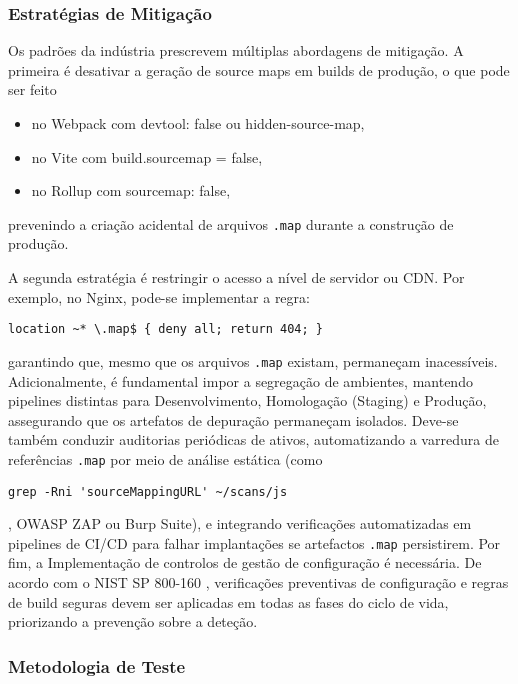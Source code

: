 \subsubsection{Estratégias de Mitigação}
\label{subsubsec:mitigacao-SME}

Os padrões da indústria prescrevem múltiplas abordagens de mitigação. A primeira é desativar a geração de source maps em builds de produção, o que pode ser feito 
\begin{itemize}
\item no Webpack com devtool: false ou hidden-source-map, 
\item no Vite com build.sourcemap = false, 
\item no Rollup com sourcemap: false, 
\end{itemize}
prevenindo a criação acidental de arquivos \texttt{.map} durante a construção de produção. 

A segunda estratégia é restringir o acesso a nível de servidor ou CDN. Por exemplo, no Nginx, pode-se implementar a regra:  

\begin{verbatim}
location ~* \.map$ { deny all; return 404; }
\end{verbatim}

garantindo que, mesmo que os arquivos \texttt{.map} existam, permaneçam inacessíveis. Adicionalmente, é fundamental impor a segregação de ambientes, mantendo pipelines distintas para Desenvolvimento, Homologação (Staging) e Produção, assegurando que os artefatos de depuração permaneçam isolados. Deve-se também conduzir auditorias periódicas de ativos, automatizando a varredura de referências \texttt{.map} por meio de análise estática (como 

\begin{verbatim}
grep -Rni 'sourceMappingURL' ~/scans/js
\end{verbatim}

, OWASP ZAP ou Burp Suite), e integrando verificações automatizadas em pipelines de CI/CD para falhar implantações se artefactos \texttt{.map} persistirem. Por fim, a Implementação de controlos de gestão de configuração é necessária. De acordo com o NIST SP 800-160 \cite{ref45}, verificações preventivas de configuração e regras de build seguras devem ser aplicadas em todas as fases do ciclo de vida, priorizando a prevenção sobre a deteção. 

\subsubsection{Metodologia de Teste}
\label{subsubsec:metogologia-teste-SME}

